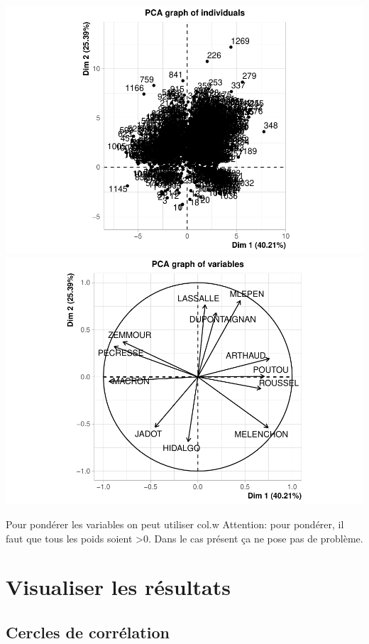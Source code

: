 \documentclass[
]{book}
\begin{document}
\includegraphics{bookdown-demo_files/figure-latex/unnamed-chunk-60-1.pdf} \includegraphics{bookdown-demo_files/figure-latex/unnamed-chunk-60-2.pdf}

Pour pondérer les variables on peut utiliser col.w Attention: pour pondérer, il faut que tous les poids soient \textgreater0. Dans le cas présent ça ne pose pas de problème.

\hypertarget{visualiser-les-ruxe9sultats}{%
\section{Visualiser les résultats}\label{visualiser-les-ruxe9sultats}}

\hypertarget{cercles-de-corruxe9lation}{%
\subsection{Cercles de corrélation}\label{cercles-de-corruxe9lation}}
\end{document}
